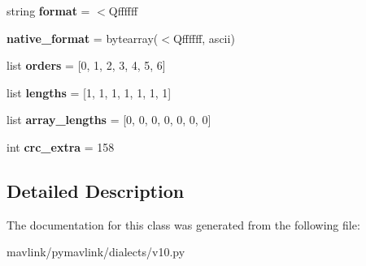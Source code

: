 \begin{DoxyCompactItemize}
string {\bfseries format} = \textquotesingle{}$<$Qffffff\textquotesingle{}
\item 
\mbox{\label{classpymavlink_1_1dialects_1_1v10_1_1MAVLink__vision__position__estimate__message_a7649de098bfe5e12ce096f2b4f705466}} 
{\bfseries native\+\_\+format} = bytearray(\textquotesingle{}$<$Qffffff\textquotesingle{}, \textquotesingle{}ascii\textquotesingle{})
\item 
\mbox{\label{classpymavlink_1_1dialects_1_1v10_1_1MAVLink__vision__position__estimate__message_ac617dfae36a28e7438c7dbf068a6c56b}} 
list {\bfseries orders} = \mbox{[}0, 1, 2, 3, 4, 5, 6\mbox{]}
\item 
\mbox{\label{classpymavlink_1_1dialects_1_1v10_1_1MAVLink__vision__position__estimate__message_a0b2bec0d67b31244e10afa68f3de02b4}} 
list {\bfseries lengths} = \mbox{[}1, 1, 1, 1, 1, 1, 1\mbox{]}
\item 
\mbox{\label{classpymavlink_1_1dialects_1_1v10_1_1MAVLink__vision__position__estimate__message_a9ebda1a295cf88ac9b30d3e45a47fdf2}} 
list {\bfseries array\+\_\+lengths} = \mbox{[}0, 0, 0, 0, 0, 0, 0\mbox{]}
\item 
\mbox{\label{classpymavlink_1_1dialects_1_1v10_1_1MAVLink__vision__position__estimate__message_ae3c32ee0527316b4b454f8ee0d885b8f}} 
int {\bfseries crc\+\_\+extra} = 158
\end{DoxyCompactItemize}


\subsection{Detailed Description}
\begin{DoxyVerb}\end{DoxyVerb}
 

The documentation for this class was generated from the following file\+:\begin{DoxyCompactItemize}
\item 
mavlink/pymavlink/dialects/v10.\+py\end{DoxyCompactItemize}
